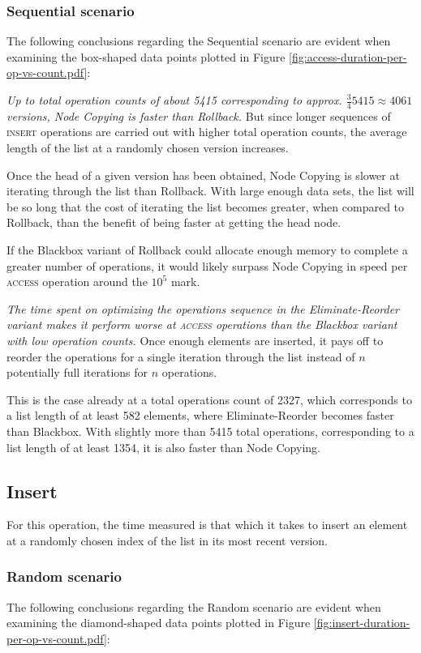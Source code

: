 \subsubsection{Sequential scenario}
The following conclusions regarding the Sequential scenario are evident when
examining the box-shaped data points plotted in Figure
\ref{fig:access-duration-per-op-vs-count.pdf}:

\textit{Up to total operation counts of about 5415 corresponding to approx.
$\frac{3}{4}5415 \approx 4061$ versions, Node Copying is faster than Rollback.}
But since longer sequences of \textsc{insert} operations are carried out with
higher total operation counts, the average length of the list at a randomly
chosen version increases.

Once the head of a given version has been obtained, Node Copying is slower at
iterating through the list than Rollback. With large enough data sets, the list
will be so long that the cost of iterating the list becomes greater, when
compared to Rollback, than the benefit of being faster at getting the head node.

If the Blackbox variant of Rollback could allocate enough memory to complete a
greater number of operations, it would likely surpass Node Copying in speed per
\textsc{access} operation around the $10^5$ mark.

\textit{The time spent on optimizing the operations sequence in the
Eliminate-Reorder variant makes it perform worse at \textsc{access} operations
than the Blackbox variant with low operation counts.} Once enough elements are
inserted, it pays off to reorder the operations for a single iteration through
the list instead of $n$ potentially full iterations for $n$ operations.

This is the case already at a total operations count of 2327, which corresponds
to a list length of at least 582 elements, where Eliminate-Reorder becomes
faster than Blackbox. With slightly more than 5415 total operations,
corresponding to a list length of at least 1354, it is also faster than Node
Copying.

\subsection{Insert}
For this operation, the time measured is that which it takes to insert an
element at a randomly chosen index of the list in its most recent version.

\subsubsection{Random scenario}
The following conclusions regarding the Random scenario are evident when
examining the diamond-shaped data points plotted in Figure
\ref{fig:insert-duration-per-op-vs-count.pdf}:

